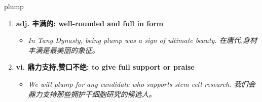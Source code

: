 
\begin{frame}
{\huge plump}
\begin{center}
\begin{enumerate}\Large
  \item \textbf{adj. 丰满的: well-rounded and full in form}
  \begin{itemize}
    \item \em{\Large{In Tang Dynasty, being plump was a sign of ultimate beauty. 在唐代,身材丰满是最美丽的象征。}}
  \end{itemize}
  \item \textbf{vi. 鼎力支持,赞口不绝: to give full support or praise}
  \begin{itemize}
    \item \em{\Large{We will plump for any candidate who supports stem cell research. 我们会鼎力支持那些拥护干细胞研究的候选人。}}
  \end{itemize}
\end{enumerate}
\end{center}
\end{frame}
